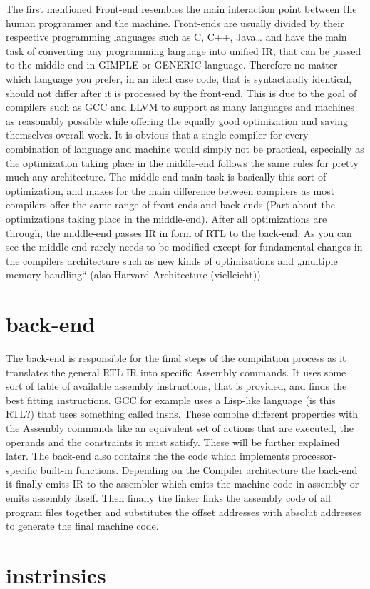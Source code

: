 The first mentioned Front-end resembles the main interaction point between the human programmer and the machine.
Front-ends are usually divided by their respective programming languages such as C, C++, Java…  and have the main task of converting any programming language into unified IR, that can be passed to the middle-end in GIMPLE or GENERIC language.
Therefore no matter which language you prefer, in an ideal case code, that is syntactically identical, should not differ after it is processed by the front-end.
This is due to the goal of compilers such as GCC and LLVM to support as many languages and machines as reasonably possible while offering the equally good optimization and saving themselves overall work.
It is obvious that a single compiler for every combination of language and machine would simply not be practical, especially as the optimization taking place in the middle-end follows the same rules for pretty much any architecture.
The middle-end main task is basically this sort of optimization, and makes for the main difference between compilers as most compilers offer the same range of front-ends and back-ends (Part about the optimizations taking place in the middle-end).
After all optimizations are through, the middle-end passes IR in form of RTL to the back-end.
As you can see the middle-end rarely needs to be modified except for fundamental changes in the compilers architecture such as new kinds of optimizations and „multiple memory handling“ (also Harvard-Architecture (vielleicht)).

\section{back-end}
The back-end is responsible for the final steps of the compilation process as it translates the general RTL IR into specific Assembly commands.
It uses some sort of table of available assembly instructions, that is provided, and finds the best fitting instructions.
GCC for example uses a Lisp-like language (is this RTL?) that uses something called insns.
These combine different properties with the  Assembly commands like an equivalent set of actions that are executed, the  operands and the constraints it must satisfy.
These will be further explained later.
The back-end also contains the the code which implements processor-specific built-in functions.
Depending on the Compiler architecture the back-end it finally emits IR to the assembler which emits the machine code in assembly or emits assembly itself.
Then finally the linker links the assembly code of all program files together and substitutes the offset addresses with absolut addresses to generate the final machine code.



\section{instrinsics}
